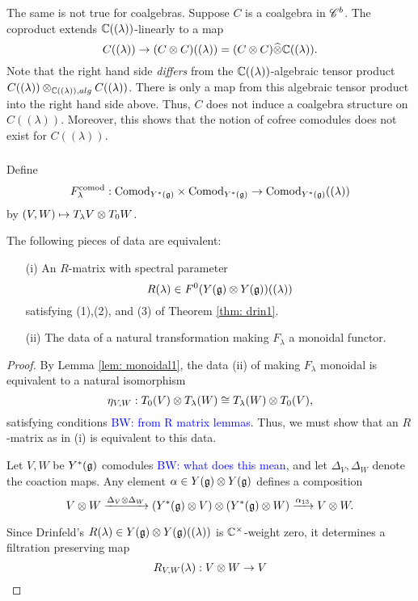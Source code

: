 \documentclass[11pt]{amsart}
\def\yscomod{{\rm Comod}_{Y^*(\fg)}}
\def\yslcomod{{\rm Comod}_{Y^*(\fg)}((\lambda))}
\def\brian{\textcolor{blue}{BW: }\textcolor{blue}}
\begin{document}
The same is not true for coalgebras. 
Suppose $C$ is a coalgebra in $\mathscr C^b$.
The coproduct extends $\mathbb C((\lambda))$-linearly to a map
\[
C((\lambda)) \to (C \otimes C) ((\lambda)) = (C \otimes C) \widehat{\otimes} \mathbb C((\lambda)) .
\] 
Note that the right hand side {\em differs} from the $\mathbb C((\lambda))$-algebraic tensor product $C((\lambda)) \otimes_{\mathbb C((\lambda)), alg} C((\lambda))$. 
There is only a map from this algebraic tensor product into the right hand side above.
Thus, $C$ does not induce a coalgebra structure on $C((\lambda))$. 
Moreover, this shows that the notion of cofree comodules does not exist for $C((\lambda))$. 

\subsubsection{}

Define 
\[
F^{\rm comod}_{\lambda} : \yscomod \times \yscomod \to \yslcomod 
\]
by $(V,W) \mapsto T_{\lambda} V \otimes T_0 W$. 
 
\begin{thm}\label{thm: comodequiv}
The following pieces of data are equivalent:
\begin{itemize}
\item[(i)] An $R$-matrix with spectral parameter
\[
R(\lambda) \in F^0(Y(\mathfrak g) \otimes Y(\mathfrak g))((\lambda))
\]
satisfying (1),(2), and (3) of Theorem \ref{thm: drin1}.
\item[(ii)] 
The data of a natural transformation making $F_\lambda$ a monoidal functor.
\end{itemize}
\end{thm}
\begin{proof}
By Lemma \ref{lem: monoidal1}, the data (ii) of making $F_\lambda$ monoidal is equivalent to a natural isomorphism
\[
\eta_{V,W} : T_0(V) \otimes T_\lambda(W) \cong T_\lambda(W) \otimes T_0(V),
\]
satisfying conditions \brian{from R matrix lemmas}. 
Thus, we must show that an $R$-matrix as in (i) is equivalent to this data.

Let $V, W$ be $Y^*(\mathfrak g)$ comodules \brian{what does this mean}, and let $\Delta_V, \Delta_W$ denote the coaction maps.
Any element $\alpha \in Y(\mathfrak g) \otimes Y(\mathfrak g)$ defines a composition
\[
V \otimes W \xrightarrow{\Delta_V \otimes \Delta_W} (Y^*(\mathfrak g) \otimes V) \otimes (Y^*(\mathfrak g) \otimes W) \xrightarrow{\alpha_{13}} V \otimes W .
\]

Since Drinfeld's $R(\lambda) \in Y(\mathfrak g) \otimes Y(\mathfrak g) ((\lambda))$ is $\mathbb C^\times$-weight zero, it determines a filtration preserving map
\[
R_{V,W}(\lambda) : V \otimes W \to V
\]
\end{proof}
\end{document}

